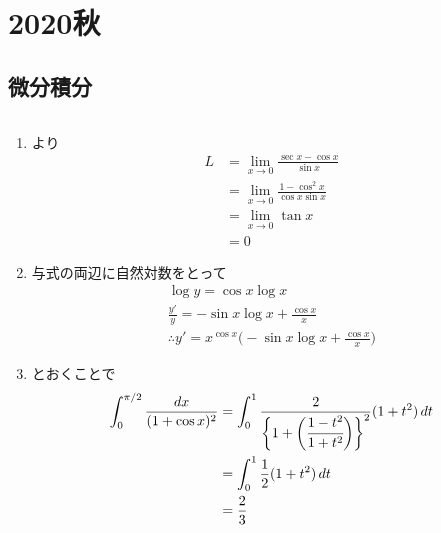 \newpage
\section{2020秋}

\setcounter{yearcounter}{2020}


\subsection{微分積分}
\begin{ans*}
  ${}$
  \begin{enumerate}[label=(\alph*)]
    \item {}より
    \begin{align}
      L
      &= \lim_{x\to 0}\frac{\sec x - \cos x}{\sin x} \\
      &= \lim_{x\to 0}\frac{1-\cos^2 x}{\cos x \sin x} \\
      &= \lim_{x\to 0}\tan x \\
      &= 0
    \end{align}
    \item 与式の両辺に自然対数をとって
    \begin{gather}
      \log y = \cos x \log x \\
      \frac{y'}{y} = -\sin x \log x + \frac{\cos x}{x} \\
      \therefore y' = x^{\cos x}\biggl(-\sin x \log x + \frac{\cos x}{x}\biggr)
    \end{gather}
    \item {}とおくことで
    \begin{align}
      \int_{0}^{\pi/2} \frac{dx}{(1+\cos x)^2}
      &= \int_{0}^{1}\frac{2}{\biggl\{ 1+\biggl(\cfrac{1-t^2}{1+t^2}\biggr) \biggr\}^2}(1+t^2)\,dt \\
      &= \int_{0}^{1}\frac{1}{2}(1+t^2)\,dt \\
      &= \frac{2}{3}
    \end{align}
  \end{enumerate}
\end{ans*}


